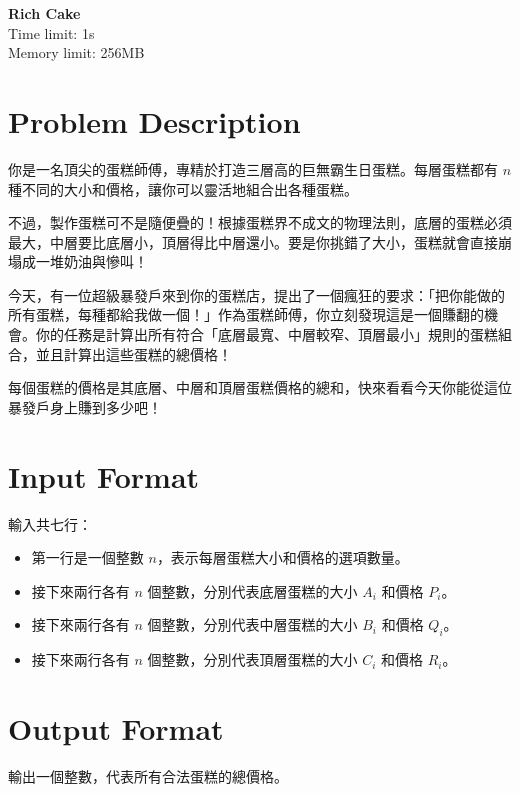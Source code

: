 \documentclass[12pt, a4paper]{article}
\begin{document}
\begin{center}
    \parbox{0.8\textwidth}{
        \centering
        \vspace{0.5em}
        \LARGE \textbf{Rich Cake}\\[0.5em]
        \large{Time limit: 1s}\\
        \large{Memory limit: 256MB}\\[0.8em]
    }
\end{center}
\thispagestyle{fancy}

\section*{Problem Description}
你是一名頂尖的蛋糕師傅，專精於打造三層高的巨無霸生日蛋糕。每層蛋糕都有 $n$ 種不同的大小和價格，讓你可以靈活地組合出各種蛋糕。

不過，製作蛋糕可不是隨便疊的！根據蛋糕界不成文的物理法則，底層的蛋糕必須最大，中層要比底層小，頂層得比中層還小。要是你挑錯了大小，蛋糕就會直接崩塌成一堆奶油與慘叫！

今天，有一位超級暴發戶來到你的蛋糕店，提出了一個瘋狂的要求：「把你能做的所有蛋糕，每種都給我做一個！」作為蛋糕師傅，你立刻發現這是一個賺翻的機會。你的任務是計算出所有符合「底層最寬、中層較窄、頂層最小」規則的蛋糕組合，並且計算出這些蛋糕的總價格！

每個蛋糕的價格是其底層、中層和頂層蛋糕價格的總和，快來看看今天你能從這位暴發戶身上賺到多少吧！

\section*{Input Format}
輸入共七行：
\begin{itemize}
    \item 第一行是一個整數 $n$，表示每層蛋糕大小和價格的選項數量。
    \item 接下來兩行各有 $n$ 個整數，分別代表底層蛋糕的大小 $A_i$ 和價格 $P_i$。
    \item 接下來兩行各有 $n$ 個整數，分別代表中層蛋糕的大小 $B_i$ 和價格 $Q_i$。
    \item 接下來兩行各有 $n$ 個整數，分別代表頂層蛋糕的大小 $C_i$ 和價格 $R_i$。
\end{itemize}

\section*{Output Format}
輸出一個整數，代表所有合法蛋糕的總價格。
\end{document}

